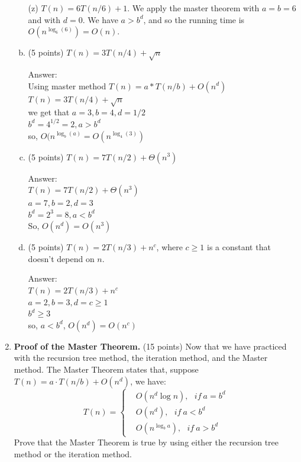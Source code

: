 \documentclass[12pt]{article}
\begin{document}
\begin{enumerate}
    \begin{enumerate}[(a)]

      \item[(z)] $T(n) = 6T(n/6) + 1$.  We apply the master theorem with $a = b = 6$ and with $d = 0$.  We have $a > b^d$, and so the running time is $O(n^{\log_6(6)}) = O(n)$.

      \item (5 points) $T(n) = 3 T(n/4) + \sqrt{n}$
      
      {\color{blue}Answer: 
      \\Using master method $T(n)= a*T(n/b)+O(n^d)$
      \\$T(n) = 3 T(n/4) + \sqrt{n}$
      \\we get that $a = 3, b=4, d= 1/2$
      \\$b^d=4^{1/2}=2, a>b^d$
      \\so, $O(n^{\log_b(a)} = O(n^{\log_4(3)})$
      }
      
      \item (5 points) $T(n) = 7 T(n/2) + \Theta(n^3)$
      
      {\color{blue}Answer:
      \\ $T(n) = 7 T(n/2) + \Theta(n^3)$
      \\$ a = 7, b= 2, d = 3$
      \\$b^d=2^3=8, a<b^d$
      \\So, $O(n^d)=O(n^3)$
      }

      \item (5 points) $T(n) = 2 T(n/3) + n^c$, where $c \geq 1$ is a constant that doesn't depend on $n$.
      
      {\color{blue}Answer: 
      \\$T(n) = 2 T(n/3) + n^c$
      \\$ a = 2, b=3, d =c \geq 1$
      \\$b^d \geq 3$
      \\so, $a< b^d$, $O(n^d) = O(n^c)$
      }

    \end{enumerate}
  
  
  \item \textbf{Proof of the Master Theorem.} (15 points) Now that we have practiced with the recursion tree method, the iteration method, and the Master method. The Master Theorem states that, suppose $T(n)=a\cdot T(n/b)+O(n^d)$, we have:
  \begin{displaymath}
  T(n)=\left\{
	\begin{aligned}
	&O(n^d\log n),~~~if~a=b^d\\
	&O(n^d),~~~if~a<b^d\\
	&O(n^{\log_b a}),~~~if~a>b^d
	\end{aligned}
	\right.
  \end{displaymath}
  Prove that the Master Theorem is true by using either the recursion tree method or the iteration method.
  

\end{enumerate}
\end{document}
